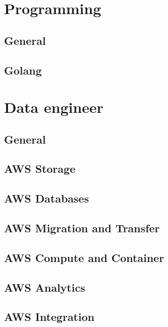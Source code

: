 \documentclass{book}
\begin{document}
\tableofcontents

\chapter{Programming}
\section{General}

\section{Golang}



\chapter{Data engineer}
\section{General}

\newpage
\section{AWS Storage}

\newpage
\section{AWS Databases}

\newpage
\section{AWS Migration and Transfer}

\newpage
\section{AWS Compute and Container}

\newpage
\section{AWS Analytics}

\newpage
\section{AWS Integration}

\newpage
\end{document}
